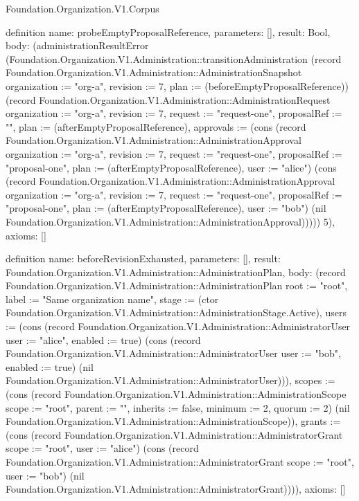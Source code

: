\begin{lexlean}{Foundation.Organization.V1.Corpus}
\begin{semanticmodule}
definition{
  name: probeEmptyProposalReference,
  parameters: [],
  result: Bool,
  body: (administrationResultError (Foundation.Organization.V1.Administration::transitionAdministration (record Foundation.Organization.V1.Administration::AdministrationSnapshot {organization := "org-a", revision := 7, plan := (beforeEmptyProposalReference)}) (record Foundation.Organization.V1.Administration::AdministrationRequest {organization := "org-a", revision := 7, request := "request-one", proposalRef := "", plan := (afterEmptyProposalReference), approvals := (cons (record Foundation.Organization.V1.Administration::AdministrationApproval {organization := "org-a", revision := 7, request := "request-one", proposalRef := "proposal-one", plan := (afterEmptyProposalReference), user := "alice"}) (cons (record Foundation.Organization.V1.Administration::AdministrationApproval {organization := "org-a", revision := 7, request := "request-one", proposalRef := "proposal-one", plan := (afterEmptyProposalReference), user := "bob"}) (nil Foundation.Organization.V1.Administration::AdministrationApproval)))})) 5),
  axioms: []
}

definition{
  name: beforeRevisionExhausted,
  parameters: [],
  result: Foundation.Organization.V1.Administration::AdministrationPlan,
  body: (record Foundation.Organization.V1.Administration::AdministrationPlan {root := "root", label := "Same organization name", stage := (ctor Foundation.Organization.V1.Administration::AdministrationStage.Active), users := (cons (record Foundation.Organization.V1.Administration::AdministratorUser {user := "alice", enabled := true}) (cons (record Foundation.Organization.V1.Administration::AdministratorUser {user := "bob", enabled := true}) (nil Foundation.Organization.V1.Administration::AdministratorUser))), scopes := (cons (record Foundation.Organization.V1.Administration::AdministrationScope {scope := "root", parent := "", inherits := false, minimum := 2, quorum := 2}) (nil Foundation.Organization.V1.Administration::AdministrationScope)), grants := (cons (record Foundation.Organization.V1.Administration::AdministratorGrant {scope := "root", user := "alice"}) (cons (record Foundation.Organization.V1.Administration::AdministratorGrant {scope := "root", user := "bob"}) (nil Foundation.Organization.V1.Administration::AdministratorGrant)))}),
  axioms: []
}


\end{semanticmodule}
\end{lexlean}
